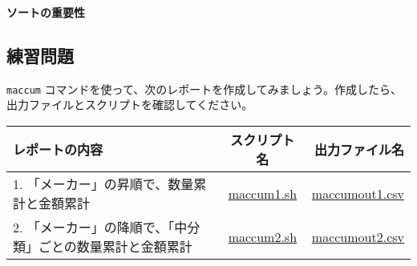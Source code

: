 \vspace {5mm}

{\setlength{\parindent}{0cm}

\textbf{ソートの重要性}\\

}


\subsection{練習問題}

\verb|maccum| コマンドを使って、次のレポートを作成してみましょう。作成したら、出力ファイルとスクリプトを確認してください。

\begin{table}[htbp]
{\small
\begin{tabular}{ l | c || r }
\hline
\textbf{レポートの内容}   & \textbf{スクリプト名} & \textbf{出力ファイル名}  \\
\hline
1. 「メーカー」の昇順で、数量累計と金額累計 & \href{exercise/maccum1.sh}{maccum1.sh} & \href{exercise/outdat/maccumout1.csv}{maccumout1.csv} \\
2. 「メーカー」の降順で、「中分類」ごとの数量累計と金額累計 & \href{exercise/maccum2.sh}{maccum2.sh} & \href{exercise/outdat/maccumout2.csv}{maccumout2.csv} \\


\hline
\end{tabular} 
}
\end{table} 


%
